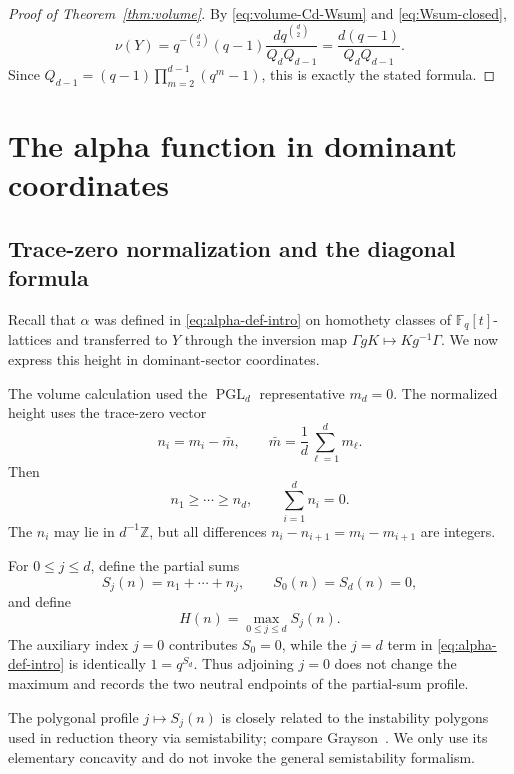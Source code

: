 \documentclass[11pt]{amsart}
\newcommand{\Fq}{\mathbb F_q}
\newcommand{\ZZ}{\mathbb Z}
\newcommand{\PGL}{\operatorname{PGL}}
\theoremstyle{plain}
\theoremstyle{definition}
\numberwithin{equation}{section}
\begin{document}
\begin{proof}[Proof of Theorem~\ref{thm:volume}]
By \eqref{eq:volume-Cd-Wsum} and \eqref{eq:Wsum-closed},
\[
  \nu(Y)
  =q^{-\binom d2}(q-1)\frac{dq^{\binom d2}}{Q_dQ_{d-1}}
  =\frac{d(q-1)}{Q_dQ_{d-1}}.
\]
Since $Q_{d-1}=(q-1)\prod_{m=2}^{d-1}(q^m-1)$, this is exactly the stated formula.
\end{proof}

\section{The alpha function in dominant coordinates}

\subsection{Trace-zero normalization and the diagonal formula}

Recall that \(\alpha\) was defined in \eqref{eq:alpha-def-intro} on homothety
classes of \(\Fq[t]\)-lattices and transferred to \(Y\) through the inversion map
\(\Gamma gK\mapsto Kg^{-1}\Gamma\).  We now express this height in dominant-sector
coordinates.

The volume calculation used the $\PGL_d$ representative $m_d=0$.  The normalized height
uses the trace-zero vector
\begin{equation}\label{eq:n-trace-zero}
  n_i=m_i-\bar m,
  \qquad
  \bar m=\frac1d\sum_{\ell=1}^dm_\ell.
\end{equation}
Then
\[
  n_1\ge\cdots\ge n_d,
  \qquad
  \sum_{i=1}^dn_i=0.
\]
The $n_i$ may lie in $d^{-1}\ZZ$, but all differences $n_i-n_{i+1}=m_i-m_{i+1}$ are
integers.

For $0\le j\le d$, define the partial sums
\begin{equation}\label{eq:Sj-H}
  S_j(n)=n_1+\cdots+n_j,
  \qquad S_0(n)=S_d(n)=0,
\end{equation}
and define
\begin{equation}\label{eq:H-def}
  H(n)=\max_{0\le j\le d}S_j(n).
\end{equation}
The auxiliary index \(j=0\) contributes \(S_0=0\), while the \(j=d\) term in
\eqref{eq:alpha-def-intro} is identically \(1=q^{S_d}\).  Thus adjoining \(j=0\) does not
change the maximum and records the two neutral endpoints of the partial-sum profile.


The polygonal profile \(j\mapsto S_j(n)\) is closely related to the instability polygons
used in reduction theory via semistability; compare Grayson~\cite{Grayson}.  We only use
its elementary concavity and do not invoke the general semistability formalism.
\end{document}
